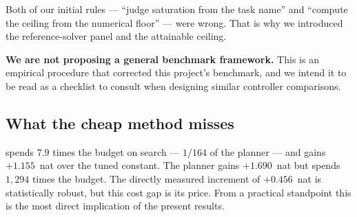 Both of our initial rules --- ``judge saturation from the task name'' and ``compute
the ceiling from the numerical floor'' --- were wrong. That is why we introduced the
reference-solver panel and the attainable ceiling.

\textbf{We are not proposing a general benchmark framework.} This is an empirical
procedure that corrected this project's benchmark, and we intend it to be read as a
checklist to consult when designing similar controller comparisons.

\subsection{What the cheap method misses}
\label{sec:cheap}

 spends $7.9$ times the budget on search --- $1/164$ of the planner
--- and gains $+1.155$~nat over the tuned constant. The planner gains $+1.690$~nat
but spends $1{,}294$ times the budget. The directly measured increment of
$+0.456$~nat is statistically robust, but this cost gap is its price. From a
practical standpoint this is the most direct implication of the present results.
